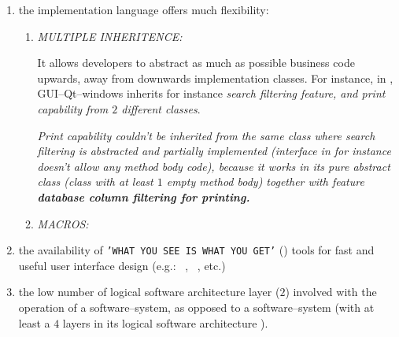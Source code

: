 \begin{enumerate}[1.]

	\item the implementation language \cplusplus
		offers much flexibility:
		
		\begin{enumerate}[1.]
			\item \emph{MULTIPLE INHERITENCE:}
			
			It allows developers to abstract as much as possible
			business code upwards, away from downwards implementation
			classes. For instance,  in \yerotherpblack,
			GUI--Qt--windows inherits for instance
			\emph{search filtering feature, and print capability
			from $2$ different classes}.

			\emph{Print capability couldn't be inherited from the
			same class where search filtering is abstracted and
			partially implemented (interface in \Java for instance
			doesn't allow any method body code), because it works
			in its pure abstract class (\cplusplus class with at
			least $1$ empty method body) together with feature
			\textbf{database column filtering for printing.}}
			\newline
			
			\emph{}
		
			\item \emph{MACROS:}
		\end{enumerate}						
		
	\item the availability of \texttt{'WHAT YOU SEE IS WHAT YOU GET'}
		(\wy) tools for fast and useful
		user interface design (e.g.: \qtdesigner~\cite{qtdesigner:2020},
		\ministudio~\cite{miniStudio:2020}, etc.)
		
	\item the low number of logical software architecture
		layer ($2$) involved with the operation
		of a \thickclient software--system,	as opposed
		to a \webbrowserbased software--system
		(with at least a $4$ layers in its 
		logical software architecture ).
	
\end{enumerate}
